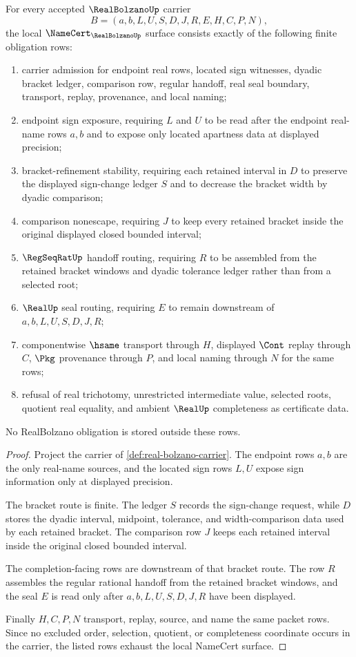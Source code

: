 \begin{theorem}
\label{thm:real-bolzano-namecert-obligations}
For every accepted $\RealBolzanoUp$ carrier
$$
B=(a,b,L,U,S,D,J,R,E,H,C,P,N),
$$
the local $\NameCert_{\RealBolzanoUp}$ surface consists exactly of the following finite obligation rows:
\begin{enumerate}
\item carrier admission for endpoint real rows, located sign witnesses, dyadic bracket ledger, comparison row, regular handoff, real seal boundary, transport, replay, provenance, and local naming;
\item endpoint sign exposure, requiring $L$ and $U$ to be read after the endpoint real-name rows $a,b$ and to expose only located apartness data at displayed precision;
\item bracket-refinement stability, requiring each retained interval in $D$ to preserve the displayed sign-change ledger $S$ and to decrease the bracket width by dyadic comparison;
\item comparison nonescape, requiring $J$ to keep every retained bracket inside the original displayed closed bounded interval;
\item $\RegSeqRatUp$ handoff routing, requiring $R$ to be assembled from the retained bracket windows and dyadic tolerance ledger rather than from a selected root;
\item $\RealUp$ seal routing, requiring $E$ to remain downstream of $a,b,L,U,S,D,J,R$;
\item componentwise $\hsame$ transport through $H$, displayed $\Cont$ replay through $C$, $\Pkg$ provenance through $P$, and local naming through $N$ for the same rows;
\item refusal of real trichotomy, unrestricted intermediate value, selected roots, quotient real equality, and ambient $\RealUp$ completeness as certificate data.
\end{enumerate}
No RealBolzano obligation is stored outside these rows.
\end{theorem}
\begin{proof}
Project the carrier of \autoref{def:real-bolzano-carrier}. The endpoint rows $a,b$ are the only real-name sources, and the located sign rows $L,U$ expose sign information only at displayed precision.

The bracket route is finite. The ledger $S$ records the sign-change request, while $D$ stores the dyadic interval, midpoint, tolerance, and width-comparison data used by each retained bracket. The comparison row $J$ keeps each retained interval inside the original closed bounded interval.

The completion-facing rows are downstream of that bracket route. The row $R$ assembles the regular rational handoff from the retained bracket windows, and the seal $E$ is read only after $a,b,L,U,S,D,J,R$ have been displayed.

Finally $H,C,P,N$ transport, replay, source, and name the same packet rows. Since no excluded order, selection, quotient, or completeness coordinate occurs in the carrier, the listed rows exhaust the local NameCert surface.
\end{proof}

